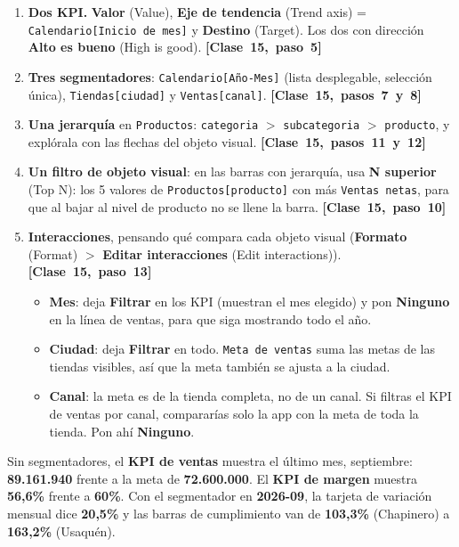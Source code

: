 \documentclass[11pt]{article}
\newcommand{\menu}[2]{\textbf{#1} {\color{black!55}(#2)}}
\newcommand{\vez}[1]{\leavevmode\mbox{\color{esumerTeal}\textbf{[#1]}}}
\begin{document}
\begin{enumerate}[itemsep=3pt, topsep=2pt]
  \item \textbf{Dos KPI.} \menu{Valor}{Value}, \menu{Eje de
    tendencia}{Trend axis} = \texttt{Calendario[Inicio de mes]} y
    \menu{Destino}{Target}. Los dos con dirección \menu{Alto es bueno}{High
    is good}. \hfill \vez{Clase 15, paso 5}
  \item \textbf{Tres segmentadores}: \texttt{Calendario[Año-Mes]} (lista
    desplegable, selección única), \texttt{Tiendas[ciudad]} y
    \texttt{Ventas[canal]}. \hfill \vez{Clase 15, pasos 7 y 8}
  \item \textbf{Una jerarquía} en \texttt{Productos}: \texttt{categoria}
    $>$ \texttt{subcategoria} $>$ \texttt{producto}, y explórala con las
    flechas del objeto visual. \hfill \vez{Clase 15, pasos 11 y 12}
  \item \textbf{Un filtro de objeto visual}: en las barras con
    jerarquía, usa \menu{N superior}{Top N}: los 5 valores de
    \texttt{Productos[producto]} con más
    \texttt{Ventas netas}, para que al bajar al nivel de producto no se
    llene la barra. \hfill \vez{Clase 15, paso 10}
  \item \textbf{Interacciones}, pensando qué compara cada objeto visual
    (\menu{Formato}{Format} $>$ \menu{Editar interacciones}{Edit
    interactions}). \vez{Clase 15, paso 13}
    \begin{itemize}[itemsep=1pt, topsep=1pt]
      \item \textbf{Mes}: deja \textbf{Filtrar} en los KPI (muestran el
        mes elegido) y pon \textbf{Ninguno} en la línea de ventas, para que
        siga mostrando todo el año.
      \item \textbf{Ciudad}: deja \textbf{Filtrar} en todo.
        \texttt{Meta de ventas} suma las metas de las tiendas visibles, así
        que la meta también se ajusta a la ciudad.
      \item \textbf{Canal}: la meta es de la tienda completa, no de un
        canal. Si filtras el KPI de ventas por canal, compararías solo la app
        con la meta de toda la tienda. Pon ahí \textbf{Ninguno}.
    \end{itemize}
\end{enumerate}

\begin{control}
\small Sin segmentadores, el \textbf{KPI de ventas} muestra el último mes,
septiembre: \textbf{89.161.940} frente a la meta de \textbf{72.600.000}. El
\textbf{KPI de margen} muestra \textbf{56,6\%} frente a \textbf{60\%}.
Con el segmentador en \textbf{2026-09}, la tarjeta de variación mensual
dice \textbf{20,5\%} y las barras de cumplimiento van de \textbf{103,3\%}
(Chapinero) a \textbf{163,2\%} (Usaquén).
\end{control}
\end{document}
